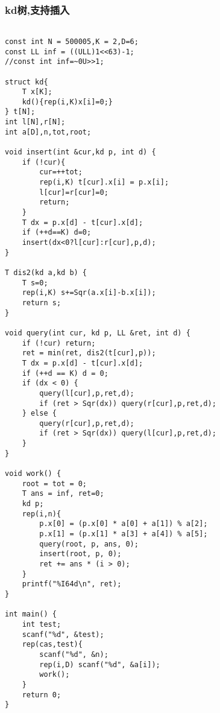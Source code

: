\subsubsection{kd树,支持插入}
\begin{verbatim}

const int N = 500005,K = 2,D=6;
const LL inf = ((ULL)1<<63)-1;
//const int inf=~0U>>1;

struct kd{
    T x[K];
    kd(){rep(i,K)x[i]=0;}
} t[N];
int l[N],r[N];
int a[D],n,tot,root;

void insert(int &cur,kd p, int d) {
    if (!cur){
        cur=++tot;
        rep(i,K) t[cur].x[i] = p.x[i];
        l[cur]=r[cur]=0;
        return;
    }
    T dx = p.x[d] - t[cur].x[d];
    if (++d==K) d=0;
    insert(dx<0?l[cur]:r[cur],p,d);
}

T dis2(kd a,kd b) {
    T s=0;
    rep(i,K) s+=Sqr(a.x[i]-b.x[i]);
    return s;
}

void query(int cur, kd p, LL &ret, int d) {
    if (!cur) return;
    ret = min(ret, dis2(t[cur],p));
    T dx = p.x[d] - t[cur].x[d];
    if (++d == K) d = 0;
    if (dx < 0) {
        query(l[cur],p,ret,d);
        if (ret > Sqr(dx)) query(r[cur],p,ret,d);
    } else {
        query(r[cur],p,ret,d);
        if (ret > Sqr(dx)) query(l[cur],p,ret,d);
    }
}

void work() {
    root = tot = 0;
    T ans = inf, ret=0;
    kd p;
    rep(i,n){
        p.x[0] = (p.x[0] * a[0] + a[1]) % a[2];
        p.x[1] = (p.x[1] * a[3] + a[4]) % a[5];
        query(root, p, ans, 0);
        insert(root, p, 0);
        ret += ans * (i > 0);
    }
    printf("%I64d\n", ret);
}

int main() {
    int test;
    scanf("%d", &test);
    rep(cas,test){
        scanf("%d", &n);
        rep(i,D) scanf("%d", &a[i]);
        work();
    }
    return 0;
}
\end{verbatim}

